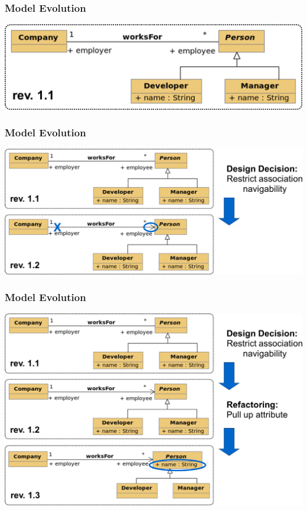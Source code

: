 \begin{frame}[t]
  \frametitle{Model Evolution}
  \begin{flushleft}
  \includegraphics[scale=0.46]{images/uml_example_01}
  \end{flushleft}
\end{frame}

\begin{frame}[t,noframenumbering]
  \frametitle{Model Evolution}
  \begin{flushleft}
  \includegraphics[scale=0.46]{images/uml_example_02}
  \end{flushleft}
\end{frame}

\begin{frame}[t,noframenumbering]
  \frametitle{Model Evolution}
  \begin{flushleft}
  \includegraphics[scale=0.46]{images/uml_example_03}
  \end{flushleft}
\end{frame}

